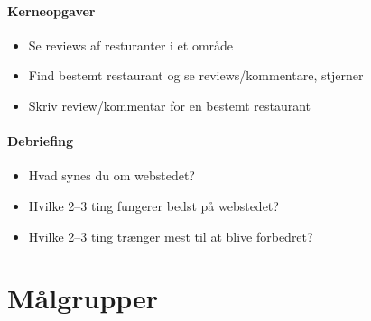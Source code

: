 \documentclass[a4paper, 12pt]{article}
\begin{document}
\paragraph{Kerneopgaver}
\begin{itemize}
\item Se reviews af resturanter i et område
\item Find bestemt restaurant og se reviews/kommentare, stjerner
\item Skriv review/kommentar for en bestemt restaurant
\end{itemize}

\paragraph{Debriefing}
\begin{itemize}
\item Hvad synes du om webstedet?
\item Hvilke 2--3 ting fungerer bedst på webstedet?
\item Hvilke 2--3 ting trænger mest til at blive forbedret?
\end{itemize}

\section{Målgrupper}
\label{sub:Maalgrupper}
\end{document}
